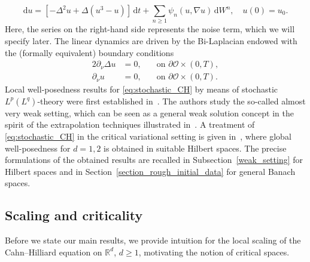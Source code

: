 \documentclass[reqno]{amsart}
\newcommand{\R}{\mathbb{R}}
\newcommand{\sO}{\mathscr{O}}
\newcommand{\1}{\mathbf{1}}
\newcommand{\grad}{\nabla}
\newcommand{\rmd}{\mathrm{d}}
\newcommand{\dt}{\,\mathrm{d}t}
\begin{document}
\begin{equation}
\label{eq:stochastic_CH}
    \rmd u = [-\Delta^2u+\Delta(u^3-u)
    ]\dt + \sum_{n \geq 1} \psi_n(u,\grad u)\,\rmd W^n,\quad u(0)=u_0.
\end{equation}
Here, the series on the right-hand side represents the noise term, which we will specify later. The linear dynamics are driven by the Bi-Laplacian endowed with the (formally equivalent) boundary conditions
\begin{alignat}{2}
    \partial_\nu \Delta u &= 0, \quad & \text{on } \partial\sO\times(0,T), \label{bc_mu_new} \\
    \partial_\nu u&= 0, \quad & \text{on } \partial\sO\times(0,T).\label{bc_phi_new}
\end{alignat}
    Local well-posedness results for \eqref{eq:stochastic_CH} by means of stochastic $L^p(L^q)$-theory were first established in~\cite[Section~7.3]{agrestiNonlinearParabolicStochastic2022}. The authors study the so-called almost very weak setting, which 
can be seen as a general weak solution concept in the spirit of the extrapolation techniques illustrated in~\cite[Chapter~V]{amannLinearQuasilinearParabolic1995}.
A treatment of \eqref{eq:stochastic_CH} in the critical variational setting is given in~\cite{agrestiCriticalVariationalSetting2024a}, where global well-posedness for $d=1,2$ is obtained in suitable Hilbert spaces.
The precise formulations of the obtained results are recalled in Subsection~\ref{weak_setting} for Hilbert spaces and in Section~\ref{section_rough_initial_data} for general Banach spaces.

\subsection{Scaling and criticality}
Before we state our main results, we provide intuition for the local scaling of the Cahn--Hilliard equation on $\R^d$, $d\ge 1$, motivating the notion of critical spaces. 
\end{document}
